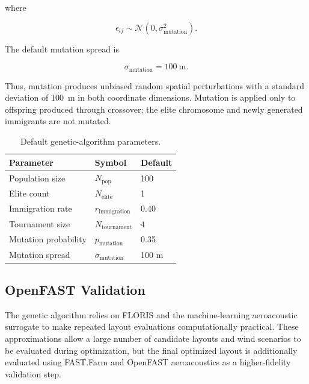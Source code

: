 \documentclass[11pt]{article}
\begin{document}
where

\begin{equation}
    \epsilon_{ij}
    \sim
    \mathcal{N}(0,\sigma_{\mathrm{mutation}}^2).
\end{equation}

The default mutation spread is

\begin{equation}
    \sigma_{\mathrm{mutation}} = 100~\mathrm{m}.
\end{equation}

Thus, mutation produces unbiased random spatial perturbations with a standard deviation of 100~m in both coordinate dimensions. Mutation is applied only to offspring produced through crossover; the elite chromosome and newly generated immigrants are not mutated.

\begin{table}[htbp]
    \centering
    \caption{Default genetic-algorithm parameters.}
    \label{tab:ga-parameters}

    \begin{tabular}{lll}
        \toprule
        \textbf{Parameter} & \textbf{Symbol} & \textbf{Default} \\
        \midrule
        Population size       & $N_{\mathrm{pop}}$        & 100 \\
        Elite count           & $N_{\mathrm{elite}}$      & 1 \\
        Immigration rate      & $r_{\mathrm{immigration}}$ & 0.40 \\
        Tournament size       & $N_{\mathrm{tournament}}$ & 4 \\
        Mutation probability  & $p_{\mathrm{mutation}}$   & 0.35 \\
        Mutation spread       & $\sigma_{\mathrm{mutation}}$ & 100 m \\
        \bottomrule
    \end{tabular}
\end{table}

\subsection{OpenFAST Validation}
\label{ssec:openfast-validation}

The genetic algorithm relies on FLORIS and the machine-learning aeroacoustic surrogate to make repeated layout evaluations computationally practical. These approximations allow a large number of candidate layouts and wind scenarios to be evaluated during optimization, but the final optimized layout is additionally evaluated using FAST.Farm and OpenFAST aeroacoustics as a higher-fidelity validation step.
\end{document}
